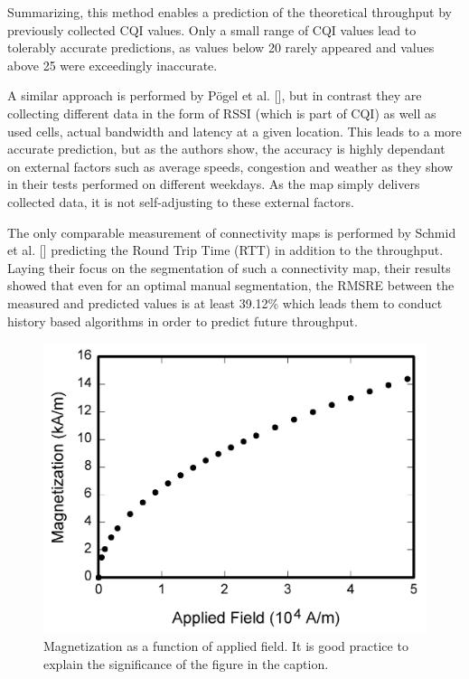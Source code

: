 \documentclass{IEEEtran}
\begin{document}
Summarizing, this method enables a prediction of the theoretical throughput by previously collected  CQI values. Only a small range of CQI values lead to tolerably accurate predictions, as values below 20 rarely appeared and values above 25 were exceedingly inaccurate.

A similar approach is performed by Pögel et al. [], but in contrast they are collecting different data in the form of RSSI (which is part of CQI) as well as used cells, actual bandwidth and latency at a given location. This leads to a more accurate prediction, but as the authors show, the accuracy is highly dependant on external factors such as average speeds, congestion and weather as they show in their tests performed on different weekdays. As the map simply delivers collected data, it is not self-adjusting to these external factors.

The only comparable measurement of connectivity maps is performed by Schmid et al. [] predicting the Round Trip Time (RTT) in addition to the throughput. Laying their focus on the segmentation of such a connectivity map, their results showed that even for an optimal manual segmentation, the RMSRE between the measured and predicted values is at least 39.12\% which leads them to conduct history based algorithms in order to predict future throughput.

















\begin{figure}[!t]
\centerline{\includegraphics[width=\columnwidth]{fig1.png}}
\caption{Magnetization as a function of applied field.
It is good practice to explain the significance of the figure in the caption.}
\label{fig1}
\end{figure}
\end{document}
